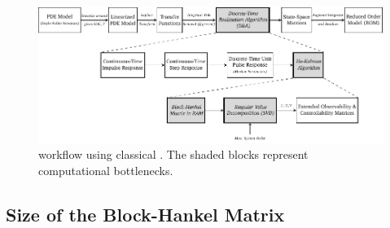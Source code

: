 \begin{figure}[!htbp]
    \centering
    \includegraphics[width=\textwidth]{traditional_dra.pdf}
    \caption[%
     workflow using classical .
    ]%
    {%
         workflow using classical
        . The shaded blocks represent computational bottlenecks.
    }%
    \label{fig:traditional_ROM_Workflow}
\end{figure}

\subsection{Size of the Block-Hankel Matrix}\label{sec:size-of-the}

